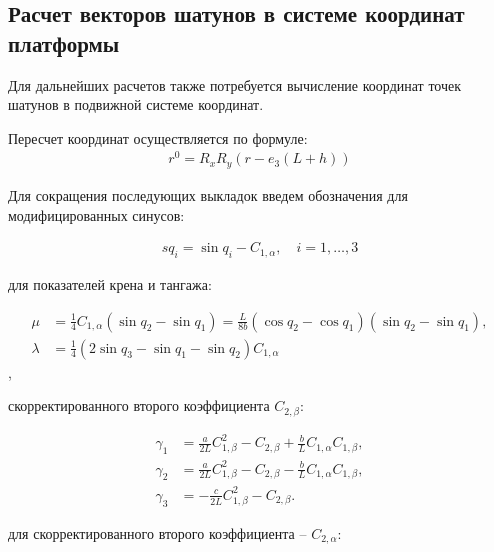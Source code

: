 \subsection{Расчет векторов шатунов в системе координат платформы}

Для дальнейших расчетов также потребуется вычисление координат точек шатунов в подвижной системе координат.

Пересчет координат осуществляется по формуле:
\begin{equation}
\begin{aligned}
	r^0 = R_xR_y\left(r - e_3\left(L + h\right)\right)
\end{aligned}
\end{equation}

Для сокращения последующих выкладок введем обозначения для модифицированных синусов:

\begin{equation}
\begin{aligned}
	sq_i = \sin{q_i} - C_{1,\alpha},\quad i =1,\ldots,3
\end{aligned}
\end{equation}

для показателей крена и тангажа:

\begin{equation}
\begin{aligned}
	\mu & = \frac{1}{4}C_{1,\alpha}\left(\sin{q_2} - \sin{q_1}\right) = \frac{L}{8b}\left(\cos{q_2}-\cos{q_1}\right)\left(\sin{q_2}-\sin{q_1}\right),\\
	\lambda & = \frac{1}{4}\left(2\sin{q_3}-\sin{q_1}-\sin{q_2}\right)C_{1,\alpha}
\end{aligned}
\end{equation},

скорректированного второго коэффициента $C_{2,\beta}$:

\begin{equation}
\begin{aligned}
	\gamma_1 & = \frac{a}{2L}C^2_{1,\beta} - C_{2,\beta} + \frac{b}{L}C_{1,\alpha}C_{1,\beta}, \\
	\gamma_2 & = \frac{a}{2L}C^2_{1,\beta} - C_{2,\beta} - \frac{b}{L}C_{1,\alpha}C_{1,\beta}, \\
	\gamma_3 & = -\frac{c}{2L}C^2_{1,\beta} - C_{2,\beta}.
\end{aligned}
\end{equation}

для скорректированного второго коэффициента -- $C_{2,\alpha}$:

